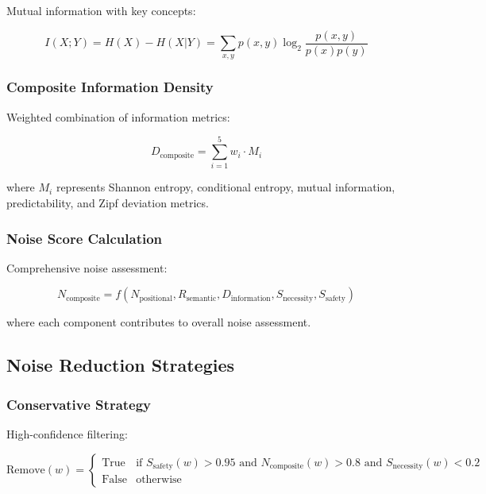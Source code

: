 \documentclass[12pt,a4paper]{article}
\begin{document}
Mutual information with key concepts:

\begin{equation}
I(X;Y) = H(X) - H(X|Y) = \sum_{x,y} p(x,y) \log_2 \frac{p(x,y)}{p(x)p(y)}
\end{equation}

\subsubsection{Composite Information Density}

Weighted combination of information metrics:

\begin{equation}
D_{\text{composite}} = \sum_{i=1}^{5} w_i \cdot M_i
\end{equation}

where $M_i$ represents Shannon entropy, conditional entropy, mutual information, predictability, and Zipf deviation metrics.

\subsubsection{Noise Score Calculation}

Comprehensive noise assessment:

\begin{equation}
N_{\text{composite}} = f(N_{\text{positional}}, R_{\text{semantic}}, D_{\text{information}}, S_{\text{necessity}}, S_{\text{safety}})
\end{equation}

where each component contributes to overall noise assessment.

\subsection{Noise Reduction Strategies}

\subsubsection{Conservative Strategy}

High-confidence filtering:

\begin{equation}
\text{Remove}(w) = \begin{cases}
\text{True} & \text{if } S_{\text{safety}}(w) > 0.95 \text{ and } N_{\text{composite}}(w) > 0.8 \text{ and } S_{\text{necessity}}(w) < 0.2 \\
\text{False} & \text{otherwise}
\end{cases}
\end{equation}
\end{document}
